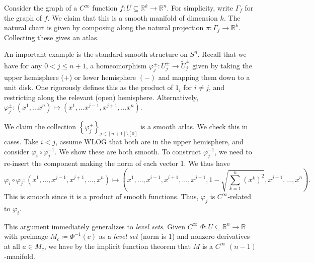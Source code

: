 Consider the graph of a $C^\infty $ function $f : U\subseteq \mathbb{R} ^k \to \mathbb{R} ^n$. For simplicity, write $\Gamma _f$ for the graph of $f$. We claim that this is a smooth manifold of dimension $k$. The natural chart is given by composing along the natural projection $\pi : \Gamma _f \to \mathbb{R} ^k$. Collecting these gives an atlas.

\begin{example}
	An important example is the standard smooth structure on $S^n$. Recall that we have for any $0<j\leq n+1$, a homeomorphism $\varphi _j^{\pm}  : U_j^{\pm}  \to \widetilde{U}_j^{\pm} $ given by taking the upper hemisphere ($+$) or lower hemisphere $(-)$ and mapping them down to a unit disk. One rigorously defines this as the product of $1_i$ for $i\neq j$, and restricting along the relevant (open) hemisphere. Alternatively, $\varphi _j^{\pm} : (x^1, \ldots x^n) \mapsto (x^1, \ldots x^{j-1} ,x^{j+1} , \ldots x^n)$.

	We claim the collection $\left\{ \varphi _j^{\pm}  \right\}_{j\in[n+1]\setminus [0]} $ is a smooth atlas. We check this in cases. Take $i<j$, assume WLOG that both are in the upper hemisphere, and consider $\varphi _i\circ \varphi _j^{-1} $. We show these are both smooth. To construct $\varphi _j^{-1} $, we need to re-insert the component making the norm of each vector 1. We thus have
	\[
		\varphi _i \circ \varphi _j : (x^1, \ldots ,x^{j-1} ,x^{j+1} ,\ldots ,x^n)\mapsto (x^1, \ldots ,x^{i-1} ,x^{i+1} ,\ldots , x^{j-1} , 1-\sqrt{\sum_{k=1}^{n}(x^k)^2} , x^{j+1} , \ldots ,x^n)
	.\]
	This is smooth since it is a product of smooth functions. Thus, $\varphi _j$ is $C^\infty $-related to $\varphi _i$.

\end{example}

	This argument immediately generalizes to \emph{level sets}. Given $C^\infty $ $\Phi : U\subseteq \mathbb{R} ^n \to \mathbb{R} $ with preimage $M_c \coloneqq \Phi ^{-1} (c)$ as a \emph{level set} (norm is 1) and nonzero derivatives at all $a\in M_c$, we have by the implicit function theorem that $M$ is a $C^\infty $ $(n-1)$-manifold.
